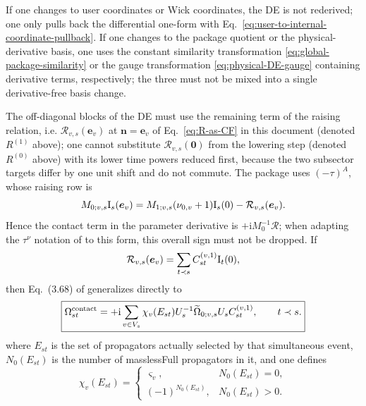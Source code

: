 \documentclass[11pt,a4paper]{article}
\newcommand{\ii}{\mathrm i}
\newcommand{\cR}{\mathcal R}
\begin{document}
If one changes to user coordinates or Wick coordinates, the DE is not rederived; one only pulls back the differential one-form with Eq.~\eqref{eq:user-to-internal-coordinate-pullback}. If one changes to the package quotient or the physical-derivative basis, one uses the constant similarity transformation \eqref{eq:global-package-similarity} or the gauge transformation \eqref{eq:physical-DE-gauge} containing derivative terms, respectively; the three must not be mixed into a single derivative-free basis change.

The off-diagonal blocks of the DE must use the remaining term of the raising relation, i.e.
$\cR_{v,s}(\bm e_v)$ at $\bm n=\bm e_v$ of Eq.~\eqref{eq:R-as-CF} in this document (denoted $R^{(1)}$
above); one cannot substitute $\cR_{v,s}(\bm0)$ from the lowering step (denoted $R^{(0)}$ above) with its
lower time powers reduced first, because the two subsector targets differ by one unit shift and do not
commute. The package uses $(-\tau)^A$, whose raising row is
\begin{equation}
 M_{0;v,s}\bm{\text I}_s(\bm e_v)
 =M_{1;v,s}(\nu_{0,v}+1)\bm{\text I}_s(0)-\cR_{v,s}(\bm e_v).
 \label{eq:package-raising-contact-sign}
\end{equation}
Hence the contact term in the parameter derivative is $+\ii M_0^{-1}\cR$; when adapting the $\tau^\nu$ notation of \cite{Chen:2023eic} to this form, this overall sign must not be dropped. If
\begin{equation}
 \cR_{v,s}(\bm e_v)=\sum_{t\prec s}C_{st}^{(v,1)}\bm{\text I}_t(0),
\end{equation}
then Eq.~(3.68) of \cite{Chen:2023eic} generalizes directly to
\begin{equation}
 \boxed{
 \Omega_{st}^{\rm contact}
 =+\ii\sum_{v\in V_s}\chi_v(E_{st})
 U_s^{-1}\widetilde\Omega_{0;v,s}U_s
 C_{st}^{(v,1)},
 \qquad t\prec s.
 }
 \label{eq:global-offdiagonal-omega}
\end{equation}
where $E_{st}$ is the set of propagators actually selected by that simultaneous event, $N_0(E_{st})$ is the number of masslessFull propagators in it, and one defines
\begin{equation}
 \chi_v(E_{st})=
 \begin{cases}
  \varsigma_v,&N_0(E_{st})=0,\\
  (-1)^{N_0(E_{st})},&N_0(E_{st})>0.
 \end{cases}
 \label{eq:contact-event-phase}
\end{equation}
\end{document}
